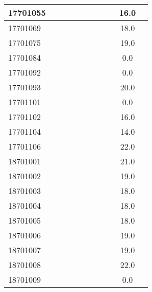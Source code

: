\documentclass[12pt]{article}
\begin{document}
\begin{center}
\begin{small}
\begin{tabular}{|l|c|c|c|c|c|c|c|c|c|c|}
17701055 &  &  &  &  &  &  &  &  & 16.0\\ \hline 
17701069 &  &  &  &  &  &  &  &  & 18.0\\ \hline 
17701075 &  &  &  &  &  &  &  &  & 19.0\\ \hline 
17701084 &  &  &  &  &  &  &  &  & 0.0\\ \hline 
17701092 &  &  &  &  &  &  &  &  & 0.0\\ \hline 
17701093 &  &  &  &  &  &  &  &  & 20.0\\ \hline 
17701101 &  &  &  &  &  &  &  &  & 0.0\\ \hline 
17701102 &  &  &  &  &  &  &  &  & 16.0\\ \hline 
17701104 &  &  &  &  &  &  &  &  & 14.0\\ \hline 
17701106 &  &  &  &  &  &  &  &  & 22.0\\ \hline 
18701001 &  &  &  &  &  &  &  &  & 21.0\\ \hline 
18701002 &  &  &  &  &  &  &  &  & 19.0\\ \hline 
18701003 &  &  &  &  &  &  &  &  & 18.0\\ \hline 
18701004 &  &  &  &  &  &  &  &  & 18.0\\ \hline 
18701005 &  &  &  &  &  &  &  &  & 18.0\\ \hline 
18701006 &  &  &  &  &  &  &  &  & 19.0\\ \hline 
18701007 &  &  &  &  &  &  &  &  & 19.0\\ \hline 
18701008 &  &  &  &  &  &  &  &  & 22.0\\ \hline 
18701009 &  &  &  &  &  &  &  &  & 0.0\\ \hline 
        \end{tabular}
            \end{small}
            \end{center}
  \centering
            
\end{document}
